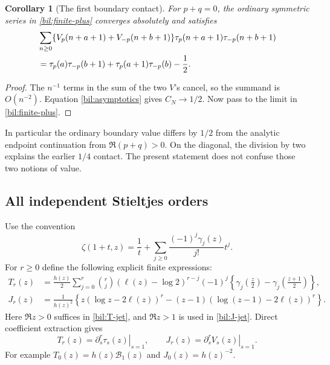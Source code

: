 \documentclass[11pt]{article}
\newtheorem{corollary}[theorem]{Corollary}
\theoremstyle{definition}
\theoremstyle{remark}
\numberwithin{equation}{section}
\begin{document}
\begin{corollary}[The first boundary contact]\label{bil:contact}
For $p+q=0$, the ordinary symmetric series in
\eqref{bil:finite-plus} converges absolutely and satisfies
\begin{align}
 &\sum_{n\ge0}\{V_p(n+a+1)+V_{-p}(n+b+1)\}
           \tau_p(n+a+1)\tau_{-p}(n+b+1)\notag\\
 &=\tau_p(a)\tau_{-p}(b+1)
        +\tau_p(a+1)\tau_{-p}(b)-\frac12.\label{bil:contact-half}
\end{align}
\end{corollary}
\begin{proof}
The $n^{-1}$ terms in the sum of the two $V$'s cancel, so the
summand is $O(n^{-2})$. Equation \eqref{bil:asymptotics} gives
$C_N\to1/2$. Now pass to the limit in \eqref{bil:finite-plus}.
\end{proof}
In particular the ordinary boundary value differs by $1/2$ from the
analytic endpoint continuation from $\Re(p+q)>0$. On the diagonal,
the division by two explains the earlier $1/4$ contact. The present
statement does not confuse those two notions of value.

\subsection{All independent Stieltjes orders}

Use the convention
\[
 \zeta(1+t,z)=\frac1t+
       \sum_{j\ge0}\frac{(-1)^j\gamma_j(z)}{j!}t^j.
\]
For $r\ge0$ define the following explicit finite expressions:
\begin{align}
 T_r(z)&=\frac{h(z)}2
  \sum_{j=0}^{r}\binom rj
  (\ell(z)-\log2)^{r-j}(-1)^j
  \left\{\gamma_j\left(\frac z2\right)
         -\gamma_j\left(\frac{z+1}{2}\right)\right\},
                                        \label{bil:T-jet}\\
 J_r(z)&=\frac1{h(z)^2}
  \left\{z(\log z-2\ell(z))^r
      -(z-1)(\log(z-1)-2\ell(z))^r\right\}.
                                        \label{bil:J-jet}
\end{align}
Here $\Re z>0$ suffices in \eqref{bil:T-jet}, and $\Re z>1$ is
used in \eqref{bil:J-jet}. Direct coefficient extraction gives
\[
 T_r(z)=\left.\partial_s^r\tau_s(z)\right|_{s=1},\qquad
 J_r(z)=\left.\partial_s^r V_s(z)\right|_{s=1}.
\]
For example $T_0(z)=h(z)\mathcal B_1(z)$ and $J_0(z)=h(z)^{-2}$.
\end{document}
